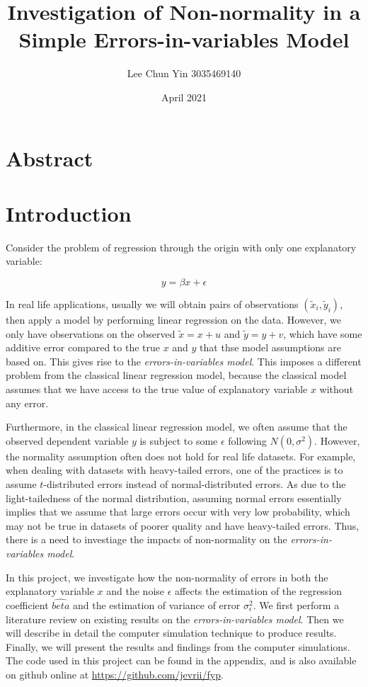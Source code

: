 \documentclass{article}
\title{Investigation of Non-normality in a Simple Errors-in-variables Model}
\author{Lee Chun Yin 3035469140}
\date{April 2021}
\begin{document}
\maketitle

\section{Abstract}

\section{Introduction}

Consider the problem of regression through the origin with only one explanatory variable:

\[
y = \beta x + \epsilon
\]

In real life applications, usually we will obtain pairs of observations $(\tilde{x}_i, \tilde{y}_i)$, then apply a model by performing linear regression on the data. However, we only have observations on the observed $\tilde{x} = x + u$ and $\tilde{y} = y + v$, which have some additive error compared to the true $x$ and $y$ that thse model assumptions are based on. This gives rise to the \textit{errors-in-variables model}. This imposes a different problem from the classical linear regression model, because the classical model assumes that we have access to the true value of explanatory variable $x$ without any error. 

Furthermore, in the classical linear regression model, we often assume that the observed dependent variable $y$ is subject to some $\epsilon$ following $N(0, \sigma^2)$. However, the normality assumption often does not hold for real life datasets. For example, when dealing with datasets with heavy-tailed errors, one of the practices is to assume $t$-distributed errors instead of normal-distributed errors. As due to the light-tailedness of the normal distribution, assuming normal errors
essentially implies that we assume that large errors occur with very low probability, which may not be true in datasets of poorer quality and have heavy-tailed errors. Thus, there is a need to investiage the impacts of non-normality on the \textit{errors-in-variables model}.

In this project, we investigate how the non-normality of errors in both the explanatory variable $x$ and the noise $\epsilon$ affects the estimation of the regression coefficient $\hat{beta}$ and the estimation of variance of error $\sigma^2_\epsilon$. We first perform a literature review on existing results on the \textit{errors-in-variables model}. Then we will describe in detail the computer simulation technique to produce results. Finally, we will present the results and findings from
the computer simulations. The code used in this project can be found in the appendix, and is also available on github online at \url{https://github.com/jevrii/fyp}.
\end{document}

